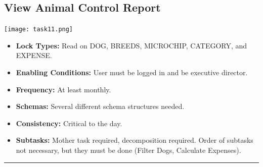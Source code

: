 \documentclass{article}
\begin{document}
\subsection{View Animal Control Report}
\begin{center}
    \texttt{[image: task11.png]}
\end{center}
\begin{itemize}
    \item \textbf{Lock Types:} Read on DOG, BREEDS, MICROCHIP, CATEGORY, and EXPENSE.
    \item \textbf{Enabling Conditions:} User must be logged in and be executive director.
    \item \textbf{Frequency:} At least monthly.
    \item \textbf{Schemas:} Several different schema structures needed.
    \item \textbf{Consistency:} Critical to the day.
    \item \textbf{Subtasks:} Mother task required, decomposition required. Order of subtasks not necessary, but they must be done (Filter Dogs, Calculate Expenses).
\end{itemize}
\noindent\rule{8cm}{0.4pt}
\end{document}
